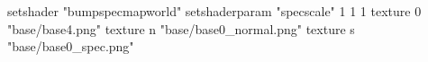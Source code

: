 setshader "bumpspecmapworld"
setshaderparam "specscale" 1 1 1
    texture 0 "base/base4.png"
    texture n "base/base0_normal.png"
    texture s "base/base0_spec.png"